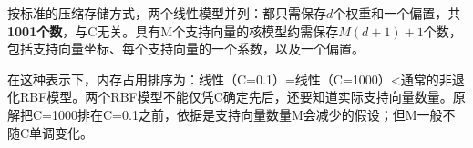 按标准的压缩存储方式，两个线性模型并列：都只需保存\(d\)个权重和一个偏置，共\textbf{1001个数}，与C无关。具有M个支持向量的核模型约需保存\(M(d+1)+1\)个数，包括支持向量坐标、每个支持向量的一个系数，以及一个偏置。


在这种表示下，内存占用排序为：线性（C=0.1）=线性（C=1000）<通常的非退化RBF模型。两个RBF模型不能仅凭C确定先后，还要知道实际支持向量数量。原解把C=1000排在C=0.1之前，依据是支持向量数量M会减少的假设；但M一般不随C单调变化。
